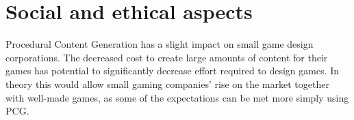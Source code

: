 \section{Social and ethical aspects}
Procedural Content Generation has a slight impact on small game design corporations.
The decreased cost to create large amounts of content for their games has potential to significantly decrease effort required to design games.
In theory this would allow small gaming companies’ rise on the market together with well-made games, as some of the expectations can be met more simply using PCG.
